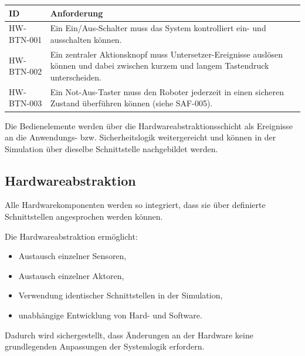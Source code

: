 \documentclass[
  a4paper,
  12pt,
  DIV=12,        %
  parskip=half,  %
  headings=small %
]{scrartcl}
\theoremstyle{definition}
\providecommand{\tightlist}{%
  \setlength{\itemsep}{0pt}\setlength{\parskip}{0pt}}
\theoremstyle{definition}
\begin{document}
\begin{longtable}[]{@{}
  >{\raggedright\arraybackslash}p{}
  >{\raggedright\arraybackslash}p{}@{}}
\toprule\noalign{}
\begin{minipage}[b]{\linewidth}\raggedright
ID
\end{minipage} & \begin{minipage}[b]{\linewidth}\raggedright
Anforderung
\end{minipage} \\
\midrule\noalign{}
\endhead
\bottomrule\noalign{}
\endlastfoot
HW-BTN-001 & Ein Ein/Aus-Schalter muss das System kontrolliert ein- und
ausschalten können. \\
HW-BTN-002 & Ein zentraler Aktionsknopf muss Untersetzer-Ereignisse
auslösen können und dabei zwischen kurzem und langem Tastendruck
unterscheiden. \\
HW-BTN-003 & Ein Not-Aus-Taster muss den Roboter jederzeit in einen
sicheren Zustand überführen können (siehe SAF-005). \\
\end{longtable}

Die Bedienelemente werden über die Hardwareabstraktionsschicht als
Ereignisse an die Anwendungs- bzw. Sicherheitslogik weitergereicht und
können in der Simulation über dieselbe Schnittstelle nachgebildet
werden.

\subsection{Hardwareabstraktion}\label{hardwareabstraktion}

Alle Hardwarekomponenten werden so integriert, dass sie über definierte
Schnittstellen angesprochen werden können.

Die Hardwareabstraktion ermöglicht:

\begin{itemize}
\tightlist
\item
  Austausch einzelner Sensoren,
\item
  Austausch einzelner Aktoren,
\item
  Verwendung identischer Schnittstellen in der Simulation,
\item
  unabhängige Entwicklung von Hard- und Software.
\end{itemize}

Dadurch wird sichergestellt, dass Änderungen an der Hardware keine
grundlegenden Anpassungen der Systemlogik erfordern.
\end{document}
